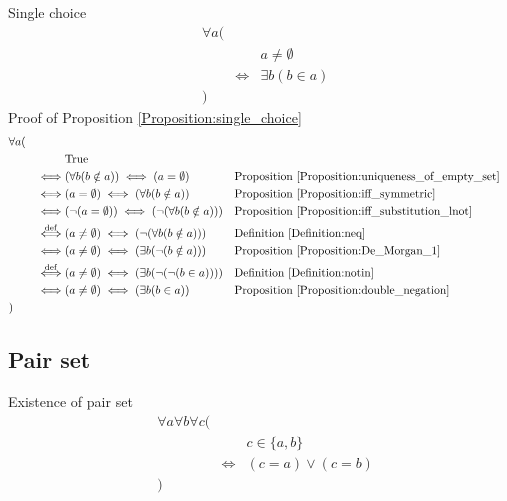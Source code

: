 \begin{prop}
\label{Proposition:single_choice}
Single choice
\begin{align*}
& \forall a ( \\
& & & a \neq \emptyset \\
& & \iff & \exists b (b \in a) \\
& )
\end{align*}
Proof of Proposition \ref{Proposition:single_choice}
\begin{align*}
& \forall a ( \\
& & & \text{True} \\
& & \iff & (\forall b (b \notin a)) \iff (a = \emptyset)
& & \text{Proposition \ref{Proposition:uniqueness_of_empty_set}} \\
& & \iff & (a = \emptyset) \iff (\forall b (b \notin a))
& & \text{Proposition \ref{Proposition:iff_symmetric}} \\
& & \iff & (\lnot (a = \emptyset)) \iff (\lnot (\forall b (b \notin a)))
& & \text{Proposition \ref{Proposition:iff_substitution_lnot}} \\
& & \overset{\operatorname{def}}{\iff} & (a \neq \emptyset) \iff (\lnot (\forall b (b \notin a)))
& & \text{Definition \ref{Definition:neq}} \\
& & \iff & (a \neq \emptyset) \iff (\exists b (\lnot (b \notin a)))
& & \text{Proposition \ref{Proposition:De_Morgan_1}} \\
& & \overset{\operatorname{def}}{\iff} & (a \neq \emptyset) \iff (\exists b (\lnot (\lnot (b \in a))))
& & \text{Definition \ref{Definition:notin}} \\
& & \iff & (a \neq \emptyset) \iff (\exists b (b \in a))
& & \text{Proposition \ref{Proposition:double_negation}} \\
& )
\end{align*}
\end{prop}

\subsection{Pair set}
\begin{axm}
\label{Axiom:existence_of_pair_set}
Existence of pair set
\begin{align*}
& \forall a \forall b \forall c ( \\
& & & c \in \{ a , b \} \\
& & \iff & (c = a) \lor (c = b) \\
& )
\end{align*}
\end{axm}

